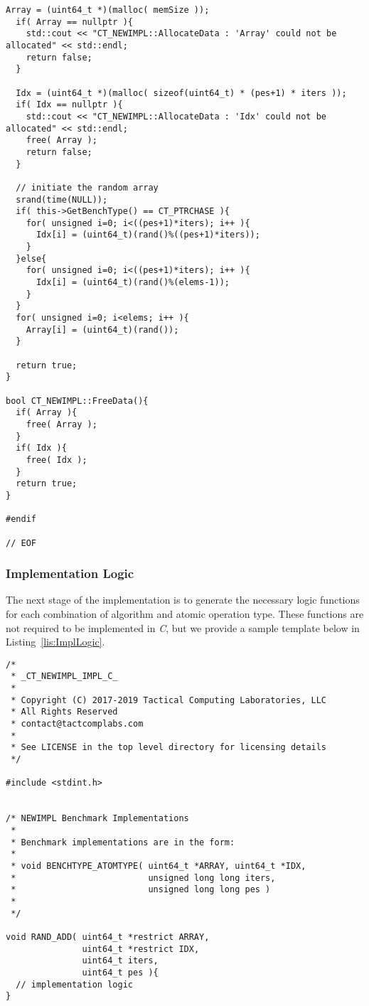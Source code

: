 \documentclass{article}
\begin{document}
\begin{lstlisting}[frame=single,style=base,caption={Implementation Overidden Functions},captionpos=b,label={lis:ImplOverFunc}]
Array = (uint64_t *)(malloc( memSize ));
  if( Array == nullptr ){
    std::cout << "CT_NEWIMPL::AllocateData : 'Array' could not be allocated" << std::endl;
    return false;
  }

  Idx = (uint64_t *)(malloc( sizeof(uint64_t) * (pes+1) * iters ));
  if( Idx == nullptr ){
    std::cout << "CT_NEWIMPL::AllocateData : 'Idx' could not be allocated" << std::endl;
    free( Array );
    return false;
  }

  // initiate the random array
  srand(time(NULL));
  if( this->GetBenchType() == CT_PTRCHASE ){
    for( unsigned i=0; i<((pes+1)*iters); i++ ){
      Idx[i] = (uint64_t)(rand()%((pes+1)*iters));
    }
  }else{
    for( unsigned i=0; i<((pes+1)*iters); i++ ){
      Idx[i] = (uint64_t)(rand()%(elems-1));
    }
  }
  for( unsigned i=0; i<elems; i++ ){
    Array[i] = (uint64_t)(rand());
  }

  return true;
}

bool CT_NEWIMPL::FreeData(){
  if( Array ){
    free( Array );
  }
  if( Idx ){
    free( Idx );
  }
  return true;
}

#endif

// EOF
\end{lstlisting}

\clearpage
\subsubsection{Implementation Logic}

The next stage of the implementation is to generate the necessary logic functions 
for each combination of algorithm and atomic operation type.  These functions are not 
required to be implemented in \textit{C}, but we provide a sample template below in Listing~\ref{lis:ImplLogic}.  

\vspace{0.125in}
\begin{lstlisting}[frame=single,style=base,caption={Implementation Logic},captionpos=b,label={lis:ImplLogic}]
/*
 * _CT_NEWIMPL_IMPL_C_
 *
 * Copyright (C) 2017-2019 Tactical Computing Laboratories, LLC
 * All Rights Reserved
 * contact@tactcomplabs.com
 *
 * See LICENSE in the top level directory for licensing details
 */

#include <stdint.h>


/* NEWIMPL Benchmark Implementations
 *
 * Benchmark implementations are in the form:
 *
 * void BENCHTYPE_ATOMTYPE( uint64_t *ARRAY, uint64_t *IDX,
 *                          unsigned long long iters,
 *                          unsigned long long pes )
 *
 */

void RAND_ADD( uint64_t *restrict ARRAY,
               uint64_t *restrict IDX,
               uint64_t iters,
               uint64_t pes ){
  // implementation logic
}
\end{lstlisting}
\end{document}
